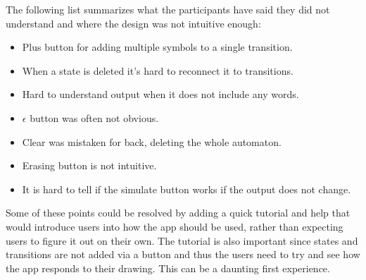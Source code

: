 The following list summarizes what the participants have said they did not understand and where the design was not intuitive enough:
\begin{itemize}
    \item Plus button for adding multiple symbols to a single transition.
    \item When a state is deleted it's hard to reconnect it to transitions.
    \item Hard to understand output when it does not include any words.
    \item $\epsilon$ button was often not obvious.
    \item Clear was mistaken for back, deleting the whole automaton.
    \item Erasing button is not intuitive.
    \item It is hard to tell if the simulate button works if the output does not change.
\end{itemize}
Some of these points could be resolved by adding a quick tutorial and help that would introduce users into how the app should be used, rather than expecting users to figure it out on their own. The tutorial is also important since states and transitions are not added via a button and thus the users need to try and see how the app responds to their drawing. This can be a daunting first experience. 


